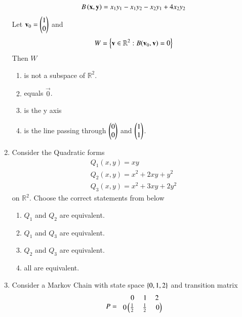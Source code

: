 \begin{enumerate}[label=\thesection.\arabic*.,ref=\thesection.\theenumi]
\begin{align}
B\left(\mathbf{x},\mathbf{y}\right) = x_1y_1 - x_1y_2-x_2y_1+4x_2y_2
\end{align}
Let $\mathbf{v}_0 = \begin{pmatrix}1\\0\end{pmatrix}$ and 
\begin{align}
W = \left\{\mathbf{v} \in \mathbb{R}^2: B(\mathbf{v}_0,\mathbf{v}) =0\right\}
\end{align}
Then $W$
\begin{enumerate}
\item is not a subspace of $\mathbb{R}^2$.
\item equals $\vec{0}$.
\item is the y axis
\item is the line passing through $\begin{pmatrix}0 \\ 0\end{pmatrix}$ and $\begin{pmatrix}1 \\ 1\end{pmatrix}$.
\end{enumerate}
%
\solution

\item Consider the Quadratic forms
\begin{align}
Q_1(x,y) = xy
\\
Q_2(x,y) = x^2+2xy+y^2
\\
Q_3(x,y) = x^2+3xy+2y^2
\end{align}
%
on $\mathbb{R}^2$.  Choose the correct statements from below
\begin{enumerate}
\item $Q_1$ and $Q_2$ are equivalent.
\item $Q_1$ and $Q_3$ are equivalent.
\item $Q_2$ and $Q_3$ are equivalent.
\item all are equivalent.
\end{enumerate}
\solution

\item Consider a Markov Chain with state space $\left\{0,1,2\right\}$ and transition matrix
\begin{align}
P = 
\begin{blockarray}{c@{\hspace{1pt}}rrr@{\hspace{3pt}}}
         & 0   & 1   & 2 \\
        \begin{block}{r@{\hspace{3pt}}@{\hspace{1pt}}
    (@{\hspace{1pt}}rrr@{\hspace{1pt}}@{\hspace{1pt}})}
        0 & \frac{1}{2} & \frac{1}{2} & 0  \\

\end{block}
\end{blockarray}
\end{align}
\end{enumerate}

